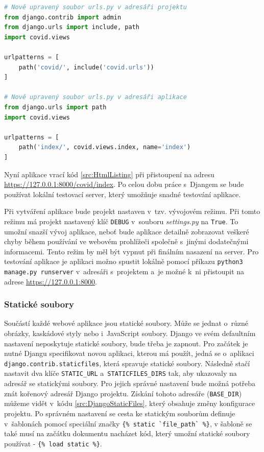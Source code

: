 \begin{lstlisting}[language=Python,label=src:DjangoPythonURLMapping,caption={Namapování URL v projektu a aplikaci Djanga \cite{django-online-dokumentace}}]
# Nově upravený soubor urls.py v adresáři projektu
from django.contrib import admin
from django.urls import include, path
import covid.views

urlpatterns = [
    path('covid/', include('covid.urls'))
]

# Nově upravený soubor urls.py v adresáři aplikace
from django.urls import path
import covid.views

urlpatterns = [
    path('index/', covid.views.index, name='index')
]
\end{lstlisting}

Nyní aplikace vrací kód \ref{src:HtmlListing} při přistoupení na adresu \url{https://127.0.0.1:8000/covid/index}. Po celou dobu práce s~Djangem se bude používat lokální testovací server, který umožňuje snadné testování aplikace.

Při vytváření aplikace bude projekt nastaven v~tzv. vývojovém režimu. Při tomto režimu má projekt nastavený klíč \texttt{DEBUG} v~souboru \emph{settings.py} na \texttt{True}. To umožní snazší vývoj aplikace, neboť bude aplikace detailně zobrazovat veškeré chyby během používání ve webovém prohlížeči společně s~jinými dodatečnými informacemi. Tento režim by měl být vypnut při finálním nasazení na server. Pro testování aplikace je aplikaci možno spustit lokálně pomocí příkazu \lstinline{python3 manage.py runserver} v~adresáři s~projektem a~je možné k~ni přistoupit na adrese \url{https://127.0.0.1:8000}.

\subsubsection*{Statické soubory}

Součástí každé webové aplikace jsou statické soubory. Může se jednat o~různé obrázky, kaskádové styly nebo i~JavaScript soubory. Django ve svém defaultním nastavení neposkytuje statické soubory, bude třeba je zapnout. Pro začátek je nutné Djangu specifikovat novou aplikaci, kterou má použít, jedná se o~aplikaci \lstinline{django.contrib.staticfiles}, která spravuje statické soubory. Následně stačí nastavit dva klíče \texttt{STATIC\_URL} a~\texttt{STATICFILES\_DIRS} tak, aby ukazovaly na adresář se statickými soubory. Pro jejich správné nastavení bude možná potřeba znát kořenový adresář Django projektu. Získání tohoto adresáře (\texttt{BASE\_DIR}) můžeme vidět v~kódu \ref{src:DjangoStaticFiles}, který obsahuje změny konfigurace projektu. Po správném nastavení se cesta ke statickým souborům definuje v~šablonách pomocí speciální značky \lstinline[language=bash]|{% static `file_path` %}|, v šabloně se také musí na začátku dokumentu nacházet kód, který umožní statické soubory používat - \lstinline[language=bash]|{% load static %}|.

